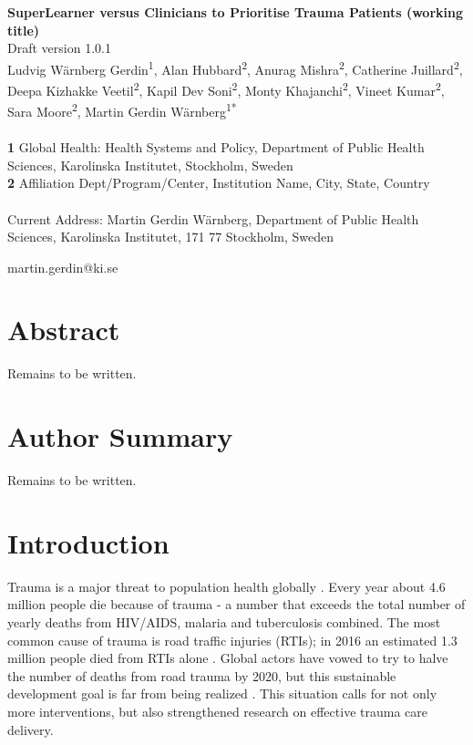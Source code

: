 \documentclass[10pt,letterpaper]{article}\usepackage[]{graphicx}\usepackage[]{color}
\begin{document}
{\Large
  \noindent\textbf{SuperLearner versus Clinicians to Prioritise Trauma Patients (working title)}
} \newline
\\
{\large
  Draft version 1.0.1
}
\newline
\\
Ludvig Wärnberg Gerdin\textsuperscript{1}, %
Alan Hubbard\textsuperscript{2}, 
Anurag Mishra\textsuperscript{2}, 
Catherine Juillard\textsuperscript{2}, %
Deepa Kizhakke Veetil\textsuperscript{2}, 
Kapil Dev Soni\textsuperscript{2}, 
Monty Khajanchi\textsuperscript{2},
Vineet Kumar\textsuperscript{2},
Sara Moore\textsuperscript{2},
Martin Gerdin Wärnberg\textsuperscript{1*\textcurrency}
\\
\bigskip
\\
\textbf{1} Global Health: Health Systems and Policy, Department of Public Health Sciences, Karolinska Institutet, Stockholm, Sweden
\\
\textbf{2} Affiliation Dept/Program/Center, Institution Name, City, State,
Country
\\
\bigskip
\\
\textcurrency Current Address: Martin Gerdin Wärnberg, Department of Public
Health Sciences, Karolinska Institutet, 171 77 Stockholm, Sweden

\noindent * martin.gerdin@ki.se
\section*{Abstract}
Remains to be written.
\section*{Author Summary}
Remains to be written.
\section*{Introduction}
Trauma is a major threat to population health globally
\cite{Brohi2017,GBD2017}. Every year about 4.6 million people die because of
trauma - a number that exceeds the total number of yearly deaths from HIV/AIDS,
malaria and tuberculosis combined. The most common cause of trauma is road
traffic injuries (RTIs); in 2016 an estimated 1.3 million people died from RTIs
alone \cite{GBD2017}. Global actors have vowed to try to halve the number of
deaths from road trauma by 2020, but this sustainable development goal is far
from being realized \cite{UN2018}. This situation calls for not only more
interventions, but also strengthened research on effective trauma care delivery.
\end{document}
